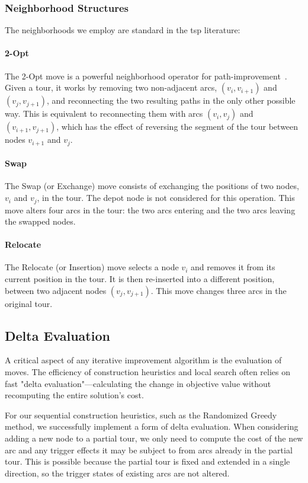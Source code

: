 \documentclass[twocolumn, switch]{article} %
\begin{document}
\subsubsection{Neighborhood Structures}
The neighborhoods we employ are standard in the \gls{tsp} literature:

\paragraph{2-Opt} The 2-Opt move is a powerful neighborhood operator for path-improvement~\cite{Croes1958}. Given a tour, it works by removing two non-adjacent arcs, $(v_i, v_{i+1})$ and $(v_j, v_{j+1})$, and reconnecting the two resulting paths in the only other possible way. This is equivalent to reconnecting them with arcs $(v_i, v_j)$ and $(v_{i+1}, v_{j+1})$, which has the effect of reversing the segment of the tour between nodes $v_{i+1}$ and $v_j$.

\paragraph{Swap} The Swap (or Exchange) move consists of exchanging the positions of two nodes, $v_i$ and $v_j$, in the tour. The depot node is not considered for this operation. This move alters four arcs in the tour: the two arcs entering and the two arcs leaving the swapped nodes.

\paragraph{Relocate} The Relocate (or Insertion) move selects a node $v_i$ and removes it from its current position in the tour. It is then re-inserted into a different position, between two adjacent nodes $(v_j, v_{j+1})$. This move changes three arcs in the original tour.

\subsection{Delta Evaluation}
A critical aspect of any iterative improvement algorithm is the evaluation of moves. The efficiency of construction heuristics and local search often relies on fast "delta evaluation"—calculating the change in objective value without recomputing the entire solution's cost.

For our sequential construction heuristics, such as the Randomized Greedy method, we successfully implement a form of delta evaluation. When considering adding a new node to a partial tour, we only need to compute the cost of the new arc and any trigger effects it may be subject to from arcs already in the partial tour. This is possible because the partial tour is fixed and extended in a single direction, so the trigger states of existing arcs are not altered.
\end{document}
